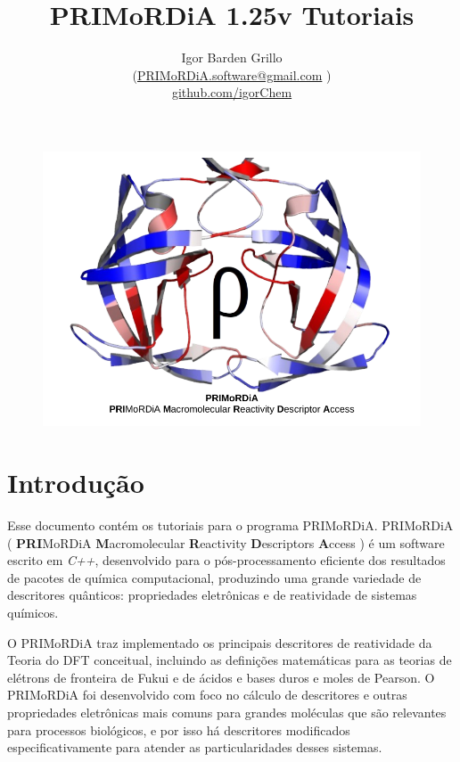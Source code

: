 \documentclass[a4paper,11pt]{refart}
\title{ \huge {PRIMoRDiA 1.25v Tutoriais} }
\author{Igor Barden Grillo \\(\url{PRIMoRDiA.software@gmail.com} )\\\url{github.com/igorChem}}
\begin{document}
	\maketitle


\hspace*{-1.2\leftmarginwidth}
\begin{minipage}{\fullwidth}
\begin{figure}[H]
\begin{center}
\includegraphics[width=7in]{images/logo_primordia}
\end{center}
\end{figure}	
\end{minipage}	
\newpage
			
\newpage
\tableofcontents
\newpage

\section*{Introdução}


Esse documento contém os tutoriais para o programa PRIMoRDiA. PRIMoRDiA ( \textbf{PRI}MoRDiA \textbf{M}acromolecular \textbf{R}eactivity \textbf{D}escriptors \textbf{A}ccess ) é um software escrito em \emph{C++}, desenvolvido para o pós-processamento eficiente dos resultados de pacotes de química computacional, produzindo uma grande variedade de descritores quânticos: propriedades eletrônicas e de reatividade de sistemas químicos. 

O PRIMoRDiA traz implementado os principais descritores de reatividade da Teoria do DFT conceitual, incluindo as definições matemáticas para as teorias de elétrons de fronteira de Fukui e de ácidos e bases duros e moles de Pearson. O PRIMoRDiA foi desenvolvido com foco no cálculo de descritores e outras propriedades eletrônicas mais comuns para grandes moléculas que são relevantes para processos biológicos, e por isso há descritores modificados especificativamente para atender as particularidades desses sistemas. 
\end{document}
